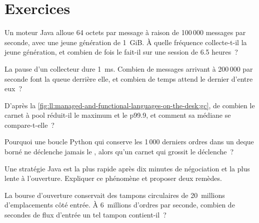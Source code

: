 \section{Exercices}

\begin{exercise}[$\star$]\label{exo:ll:managed-and-functional-languages-on-the-desk:1}
Un moteur Java alloue 64 octets par message à raison de 100\,000 messages par seconde, avec une jeune génération de 1~GiB. À quelle fréquence
collecte-t-il la jeune génération, et combien de fois le fait-il sur une session de 6.5 heures~?
\end{exercise}

\begin{exercise}[$\star$]\label{exo:ll:managed-and-functional-languages-on-the-desk:2}
La pause d'un collecteur dure \qty{1}{\milli\second}. Combien de messages arrivant à 200\,000 par seconde font la queue derrière elle, et combien de temps
attend le dernier d'entre eux~?
\end{exercise}

\begin{exercise}[$\star$]\label{exo:ll:managed-and-functional-languages-on-the-desk:3}
D'après la \cref{fig:ll:managed-and-functional-languages-on-the-desk:gc}, de combien le carnet à pool réduit-il le maximum et
le p99.9, et comment sa médiane se compare-t-elle~?
\end{exercise}

\begin{exercise}[$\star\star$]\label{exo:ll:managed-and-functional-languages-on-the-desk:4}
Pourquoi une boucle Python qui conserve les 1\,000 derniers ordres dans un deque borné ne déclenche jamais le , alors qu'un carnet qui grossit
le déclenche~?
\end{exercise}

\begin{exercise}[$\star\star$]\label{exo:ll:managed-and-functional-languages-on-the-desk:5}
Une stratégie Java est la plus rapide après dix minutes de négociation et la plus lente à l'ouverture. Expliquer ce phénomène et proposer deux remèdes.
\end{exercise}

\begin{exercise}[$\star\star$]\label{exo:ll:managed-and-functional-languages-on-the-desk:6}
La bourse d'ouverture conservait des tampons circulaires de 20~millions d'emplacements côté entrée. À 6~millions d'ordres par seconde, combien de
secondes de flux d'entrée un tel tampon contient-il~?
\end{exercise}

